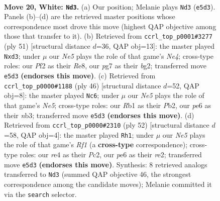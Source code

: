 \documentclass[11pt]{article}
\begin{document}
\clearpage

\begin{figure}[p]\centering
\begin{subfigure}{0.46\textwidth}\centering
\resizebox{\linewidth}{!}{%
\newchessgame
\chessboard[
  setfen={2kr4/ppp2ppp/4p3/4N3/2P1r3/8/PP1K1PRP/1R6 w - - 3 20},
  showmover=false,
  pgfstyle=straightmove, color=movearrow, markmove={e5-d3}
]}
\caption{}
\end{subfigure}\hfill
\begin{subfigure}{0.46\textwidth}\centering
\resizebox{\linewidth}{!}{%
\newchessgame
\chessboard[
  setfen={4r1k1/R3pp2/6pp/4n3/p2r4/3P2P1/P4PBP/4R1K1 b - - 2 26},
  showmover=false,
  pgfstyle=straightmove, color=movearrow, markmove={e5-d3}
]}
\caption{}
\end{subfigure}
\\[4pt]
\begin{subfigure}{0.46\textwidth}\centering
\resizebox{\linewidth}{!}{%
\newchessgame
\chessboard[
  setfen={4r1k1/2R2ppp/p2r4/4N3/Pp6/1n2P2P/1P4P1/4R1K1 w - - 1 24},
  showmover=false,
  pgfstyle=straightmove, color=movearrow, markmove={e5-c6}
]}
\caption{}
\end{subfigure}\hfill
\begin{subfigure}{0.46\textwidth}\centering
\resizebox{\linewidth}{!}{%
\newchessgame
\chessboard[
  setfen={6kr/2N3pp/p7/1p4p1/8/1P1N4/1PP1r2P/1K3R2 w - - 1 27},
  showmover=false,
  pgfstyle=straightmove, color=movearrow, markmove={f1-h1}
]}
\caption{}
\end{subfigure}
\caption{\textbf{Move 20, White: \texttt{Nd3}.} (a) Our position; Melanie plays \texttt{Nd3} (\texttt{e5d3}). Panels (b)--(d) are the retrieved master positions whose correspondence most drove this move (highest QAP objective among those that transfer to it). (b) Retrieved from \texttt{ccrl\_top\_p0001\#3277} (ply 51) [structural distance $d$=36, QAP obj=13]: the master played \texttt{Nxd3}; under $\mu$ our \emph{Ne5} plays the role of that game's \emph{Ne4}; cross-type roles: our \emph{P}f2 as their \emph{R}e8, our \emph{p}g7 as their \emph{b}g2; transferred move \texttt{e5d3} \textbf{(endorses this move)}. (c) Retrieved from \texttt{ccrl\_top\_p0000\#1188} (ply 46) [structural distance $d$=52, QAP obj=8]: the master played \texttt{Nc6}; under $\mu$ our \emph{Ne5} plays the role of that game's \emph{Ne5}; cross-type roles: our \emph{R}b1 as their \emph{P}b2, our \emph{p}e6 as their \emph{n}b3; transferred move \texttt{e5d3} \textbf{(endorses this move)}. (d) Retrieved from \texttt{ccrl\_top\_p0000\#2310} (ply 52) [structural distance $d$=58, QAP obj=4]: the master played \texttt{Rh1}; under $\mu$ our \emph{Ne5} plays the role of that game's \emph{Rf1} (a \textbf{cross-type} correspondence); cross-type roles: our \emph{r}e4 as their \emph{P}c2, our \emph{p}e6 as their \emph{r}e2; transferred move \texttt{e5d3} \textbf{(endorses this move)}. Synthesis: 8 retrieved analogs transferred to \texttt{Nd3} (summed QAP objective 46, the strongest correspondence among the candidate moves); Melanie committed it via the \texttt{search} selector.}
\label{fig:thought-m38}
\end{figure}
\end{document}
